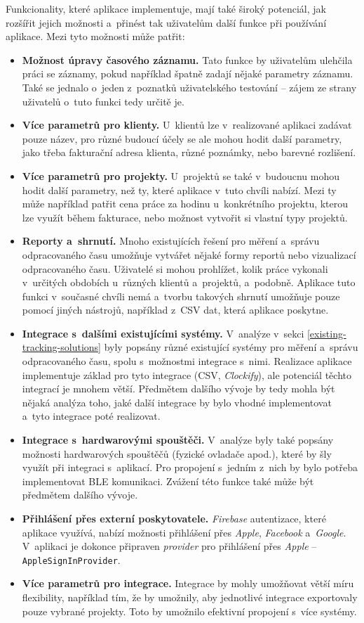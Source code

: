 Funkcionality, které aplikace implementuje, mají také široký potenciál, jak rozšířit jejich možnosti a~přinést tak uživatelům další funkce při používání aplikace. Mezi tyto možnosti může patřit:
\begin{itemize}
\item\textbf{Možnost úpravy časového záznamu.} Tato funkce by uživatelům ulehčila práci se záznamy, pokud například špatně zadají nějaké parametry záznamu. Také se jednalo o~jeden z~poznatků uživatelského testování – zájem ze strany uživatelů o~tuto funkci tedy určitě je.
\item\textbf{Více parametrů pro klienty.} U~klientů lze v~realizované aplikaci zadávat pouze název, pro různé budoucí účely se ale mohou hodit další parametry, jako třeba fakturační adresa klienta, různé poznámky, nebo barevné rozlišení.
\item\textbf{Více parametrů pro projekty.} U~projektů se také v~budoucnu mohou hodit další parametry, než ty, které aplikace v~tuto chvíli nabízí. Mezi ty může například patřit cena práce za hodinu u~konkrétního projektu, kterou lze využít během fakturace, nebo možnost vytvořit si vlastní typy projektů. 
\item\textbf{Reporty a~shrnutí.} Mnoho existujících řešení pro měření a~správu odpracovaného času umožňuje vytvářet nějaké formy reportů nebo vizualizací odpracovaného času. Uživatelé si mohou prohlížet, kolik práce vykonali v~určitých obdobích u~různých klientů a~projektů, a~podobně. Aplikace tuto funkci v~současné chvíli nemá a~tvorbu takových shrnutí umožňuje pouze pomocí jiných nástrojů, například z~CSV dat, která aplikace poskytne.
\item\textbf{Integrace s~dalšími existujícími systémy.} V~analýze v~sekci \ref{existing-tracking-solutions} byly popsány různé existující systémy pro měření a~správu odpracovaného času, spolu s~možnostmi integrace s~nimi. Realizace aplikace implementuje základ pro tyto integrace (CSV, \emph{Clockify}), ale potenciál těchto integrací je mnohem větší. Předmětem dalšího vývoje by tedy mohla být nějaká analýza toho, jaké další integrace by bylo vhodné implementovat a~tyto integrace poté realizovat.
\item\textbf{Integrace s~hardwarovými spouštěči.} V~analýze byly také popsány možnosti hardwarových spouštěčů (fyzické ovladače apod.), které by šly využít při integraci s~aplikací. Pro propojení s~jedním z~nich by bylo potřeba implementovat BLE komunikaci. Zvážení této funkce také může být předmětem dalšího vývoje.
\item\textbf{Přihlášení přes externí poskytovatele.} \emph{Firebase} autentizace, které aplikace využívá, nabízí možnosti přihlášení přes \emph{Apple}, \emph{Facebook} a~\emph{Google}. V~aplikaci je dokonce připraven \emph{provider} pro přihlášení přes \emph{Apple} – \texttt{AppleSignInProvider}.
\item\textbf{Více parametrů pro integrace.} Integrace by mohly umožňovat větší míru flexibility, například tím, že by umožnily, aby jednotlivé integrace exportovaly pouze vybrané projekty. Toto by umožnilo efektivní propojení s~více systémy.
\end{itemize}

